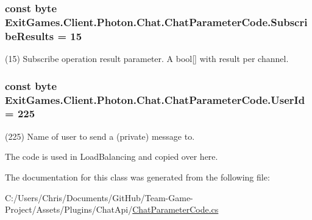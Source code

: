 \subsubsection[{\texorpdfstring{Subscribe\+Results}{SubscribeResults}}]{\setlength{\rightskip}{0pt plus 5cm}const byte Exit\+Games.\+Client.\+Photon.\+Chat.\+Chat\+Parameter\+Code.\+Subscribe\+Results = 15}\hypertarget{class_exit_games_1_1_client_1_1_photon_1_1_chat_1_1_chat_parameter_code_a4991d2c2c138a78d8c95be54d1c805da}{}\label{class_exit_games_1_1_client_1_1_photon_1_1_chat_1_1_chat_parameter_code_a4991d2c2c138a78d8c95be54d1c805da}


(15) Subscribe operation result parameter. A bool\mbox{[}\mbox{]} with result per channel.

\subsubsection[{\texorpdfstring{User\+Id}{UserId}}]{\setlength{\rightskip}{0pt plus 5cm}const byte Exit\+Games.\+Client.\+Photon.\+Chat.\+Chat\+Parameter\+Code.\+User\+Id = 225}\hypertarget{class_exit_games_1_1_client_1_1_photon_1_1_chat_1_1_chat_parameter_code_a4725b80416516202851fced3224ddf10}{}\label{class_exit_games_1_1_client_1_1_photon_1_1_chat_1_1_chat_parameter_code_a4725b80416516202851fced3224ddf10}


(225) Name of user to send a (private) message to.

The code is used in Load\+Balancing and copied over here.

The documentation for this class was generated from the following file\+:\begin{DoxyCompactItemize}
\item 
C\+:/\+Users/\+Chris/\+Documents/\+Git\+Hub/\+Team-\/\+Game-\/\+Project/\+Assets/\+Plugins/\+Chat\+Api/\hyperlink{_chat_parameter_code_8cs}{Chat\+Parameter\+Code.\+cs}\end{DoxyCompactItemize}
